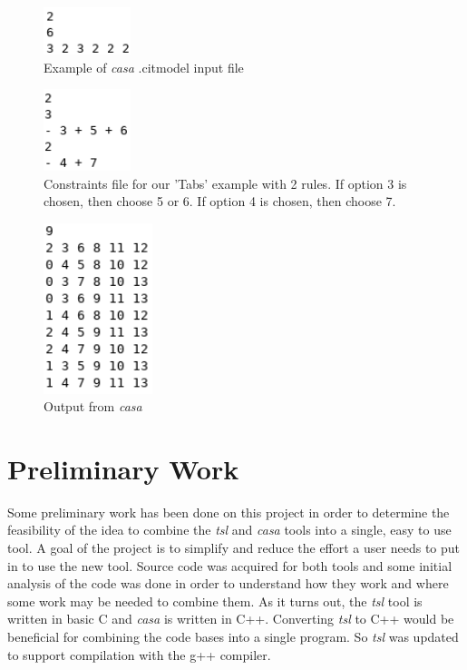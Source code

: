 \documentclass[a4full,12pt]{article}
\begin{document}
\begin{figure}[htb]
\centering
\includegraphics[width=1in,keepaspectratio]{images/casa_citmodel_input.png}
\caption{Example of \emph{casa} .citmodel input file}
\label{fig:casa_citmodel_input}
\end{figure}

\begin{figure}[htb]
\centering
\includegraphics[width=1in,keepaspectratio]{images/casa_constraints.png}
\caption{Constraints file for our 'Tabs' example with 2 rules. If option 3 is chosen, then choose 5 or 6. If option 4 is chosen, then choose 7.}
\label{fig:casa_constraints}
\end{figure}

\begin{figure}[htb]
\centering
\includegraphics[width=1.25in,keepaspectratio]{images/casa_output.png}
\caption{Output from \emph{casa}}
\label{fig:casa_output}
\end{figure}

\section{Preliminary Work}
Some preliminary work has been done on this project in order to determine the
  feasibility of the idea to combine the \emph{tsl} and \emph{casa} tools into 
  a single, easy to use tool. A goal of the project is to simplify and reduce the
  effort a user needs to put in to use the new tool. Source code was acquired for
  both tools and some initial analysis of the code was done in order to understand
  how they work and where some work may be needed to combine them. As it
  turns out, the \emph{tsl} tool is written in basic C and \emph{casa} is written
  in C++. Converting \emph{tsl} to C++ would be beneficial for combining the 
  code bases into a single program. So \emph{tsl} was updated to support compilation
  with the g++ compiler.
\end{document}
